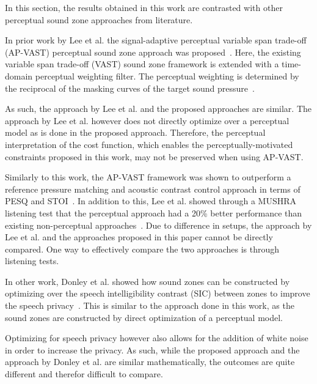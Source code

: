 In this section, the results obtained in this work are contrasted with other perceptual sound zone
approaches from literature.

In prior work by Lee et al. the signal-adaptive perceptual variable span trade-off (AP-VAST)
perceptual sound zone approach was proposed~\cite{lee2019towards, lee2020signal}.
Here, the existing variable span trade-off (VAST) sound zone framework is extended with a 
time-domain perceptual weighting filter.
The perceptual weighting is determined by the reciprocal of the masking curves of the 
target sound pressure~\cite{lee2020signal}.

As such, the approach by Lee et al. and the proposed approaches are similar.
The approach by Lee et al. however does not directly optimize over a perceptual model as is done in 
the proposed approach.
Therefore, the perceptual interpretation of the cost function, which enables the perceptually-motivated constraints
proposed in this work, 
may not be preserved when using AP-VAST. 

Similarly to this work, the AP-VAST framework was shown to outperform a reference pressure matching
and acoustic contrast control approach in terms of PESQ and STOI~\cite{lee2019towards}.
In addition to this, Lee et al. showed through a MUSHRA listening test that the perceptual approach had a 20\%
better performance than existing non-perceptual approaches~\cite{lee2020signal}.
Due to difference in setups, the approach by Lee et al. and the approaches proposed in this paper cannot be 
directly compared.
One way to effectively compare the two approaches is through listening tests.

In other work, Donley et al. showed how sound zones can be constructed by optimizing over the speech
intelligibility contrast (SIC) between zones to improve the speech 
privacy~\cite{donley2015multizone, donley2016improving, donley2018multizone}.
This is similar to the approach done in this work, as the sound zones are constructed by direct optimization
of a perceptual model.

Optimizing for speech privacy however also allows for the addition of white noise in order to increase the privacy.
As such, while the proposed approach and the approach by Donley et al. are similar mathematically, the outcomes are quite 
different and therefor difficult to compare.

